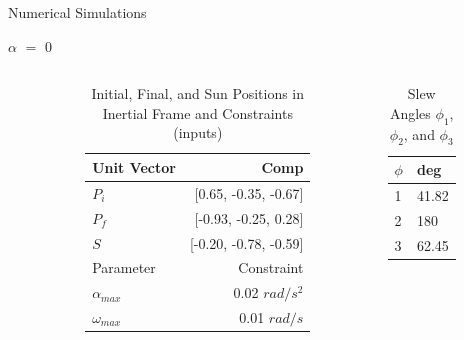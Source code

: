 \documentclass{beamer}
\begin{document}
\begin{frame}{Numerical Simulations}
	\begin{block}{$\alpha$ $=$ 0}

\begin{columns}
	\begin{column}{0.05\textwidth}
	\end{column}
	\begin{column}{0.65\textwidth}
		\begin{center}
			\begin{table}[H]
				\centering
				\caption{Initial, Final, and Sun Positions in Inertial Frame and Constraints (inputs)}
				\begin{tabular}{lr}
					\toprule
					\midrule
					Unit Vector & Comp \\
					\midrule
					$P_i$ & [0.65, -0.35, -0.67] \\
					$P_f$ & [-0.93, -0.25, 0.28] \\ 
					$S$ & [-0.20, -0.78, -0.59] \\
					\midrule
					\midrule
					Parameter & Constraint \\ 
					\midrule
					$\alpha_{max}$ & 0.02 $rad/s^2$ \\
					$\omega_{max}$ & 0.01 $rad/s$ \\ 
					\midrule
					\bottomrule
				\end{tabular}%
				\label{tab:Pi_Pf_S}%
			\end{table}
		\end{center}
	\end{column}
	\begin{column}{0.3\textwidth}
		\begin{center}
			\begin{table}[H]
				\centering
				\caption{Slew Angles $\phi_1$, $\phi_2$, and $\phi_3$}
				\begin{tabular}{ll}
					\toprule
					\midrule
					$\phi$ & deg \\
					\midrule
					1 & 41.82 \\
					2 & 180 \\ 
					3 & 62.45 \\
					\midrule
					\bottomrule
				\end{tabular}%
				\label{tab:phi_123}%
			\end{table}%
		\end{center}
	\end{column}
\end{columns}

\end{block}
\end{frame}
\end{document}

